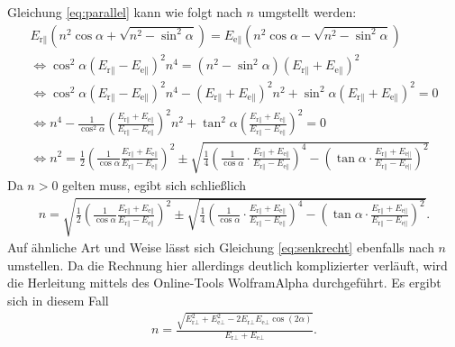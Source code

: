 \noindent
Gleichung \eqref{eq:parallel} kann wie folgt nach $n$ umgstellt werden:
\begin{gather}
    \nonumber E_{\text{r}\parallel} \left(n^2 \cos\alpha + \sqrt{n^2 - \sin^2\alpha}\right) 
    = E_{\text{e}\parallel} \left(n^2 \cos\alpha - \sqrt{n^2 - \sin^2\alpha}\right) \\
%
    \nonumber \iff \cos^2\alpha \left(E_{\text{r}\parallel} - E_{\text{e}\parallel}\right)^2 n^4 
    = \left(n^2 - \sin^2\alpha\right) \left(E_{\text{r}\parallel} + E_{\text{e}\parallel}\right)^2 \\
%
    \nonumber \iff \cos^2\alpha \left(E_{\text{r}\parallel} - E_{\text{e}\parallel}\right)^2 n^4
    - \left(E_{\text{r}\parallel} + E_{\text{e}\parallel}\right)^2 n^2 
    + \sin^2\alpha \left(E_{\text{r}\parallel} + E_{\text{e}\parallel}\right)^2  = 0\\ 
%
    \nonumber \iff n^4 - \frac{1}{\cos^2\alpha} \left(\frac{E_{\text{r}\parallel} + E_{\text{e}\parallel}}
    {E_{\text{r}\parallel} - E_{\text{e}\parallel}}\right)^2 n^2
    + \tan^2\alpha \left(\frac{E_{\text{r}\parallel} + E_{\text{e}\parallel}}
    {E_{\text{r}\parallel} - E_{\text{e}\parallel}}\right)^2 = 0\\
%
    \nonumber \iff n^2 = \frac{1}{2} \left(\frac{1}{\cos\alpha} 
    \frac{E_{\text{r}\parallel} + E_{\text{e}\parallel}}{E_{\text{r}\parallel} - E_{\text{e}\parallel}}\right)^2
    \pm \sqrt{\frac{1}{4} \left(\frac{1}{\cos\alpha} \cdot
    \frac{E_{\text{r}\parallel} + E_{\text{e}\parallel}}{E_{\text{r}\parallel} - E_{\text{e}\parallel}}\right)^4
    - \left(\tan\alpha \cdot \frac{E_{\text{r}\parallel} + E_{\text{e}\parallel}}
    {E_{\text{r}\parallel} - E_{\text{e}\parallel}}\right)^2}
\end{gather} 
Da $n > 0$ gelten muss, egibt sich schließlich
\begin{align}
    n = \sqrt{\frac{1}{2} \left(\frac{1}{\cos\alpha} 
    \frac{E_{\text{r}\parallel} + E_{\text{e}\parallel}}{E_{\text{r}\parallel} - E_{\text{e}\parallel}}\right)^2
    \pm \sqrt{\frac{1}{4} \left(\frac{1}{\cos\alpha} \cdot
    \frac{E_{\text{r}\parallel} + E_{\text{e}\parallel}}{E_{\text{r}\parallel} - E_{\text{e}\parallel}}\right)^4
    - \left(\tan\alpha \cdot \frac{E_{\text{r}\parallel} + E_{\text{e}\parallel}}
    {E_{\text{r}\parallel} - E_{\text{e}\parallel}}\right)^2}}.
    \label{eq:n_parallel}
\end{align}
Auf ähnliche Art und Weise lässt sich Gleichung \eqref{eq:senkrecht} ebenfalls nach $n$ umstellen.
Da die Rechnung hier allerdings deutlich komplizierter verläuft, wird die Herleitung mittels des Online-Tools WolframAlpha \cite{wolfram_n}
durchgeführt.
Es ergibt sich in diesem Fall
\begin{align}
    n = \frac{\sqrt{E_{\text{r}\perp}^2 + E_{\text{e}\perp}^2 - 2 E_{\text{r}\perp} E_{\text{e}\perp} \cos(2\alpha)}}
    {E_{\text{r}\perp} + E_{\text{e}\perp}}.
    \label{eq:n_senkrecht}
\end{align}

\noindent

